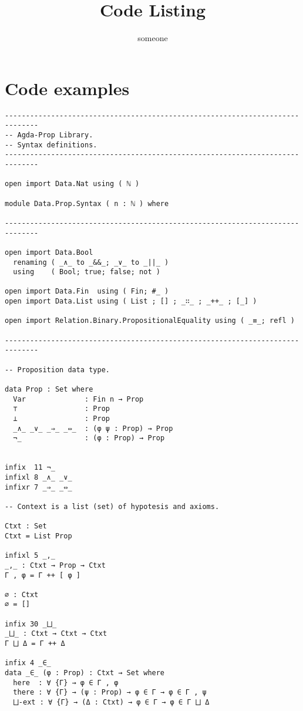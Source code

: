 \documentclass{article}
\title{Code Listing}
\author{someone}
\date{ }
\begin{document}
\maketitle

\section{Code examples}

\begin{listing}[ht]
\begin{verbatim}
------------------------------------------------------------------------------
-- Agda-Prop Library.
-- Syntax definitions.
------------------------------------------------------------------------------

open import Data.Nat using ( ℕ )

module Data.Prop.Syntax ( n : ℕ ) where

------------------------------------------------------------------------------

open import Data.Bool
  renaming ( _∧_ to _&&_; _∨_ to _||_ )
  using    ( Bool; true; false; not )

open import Data.Fin  using ( Fin; #_ )
open import Data.List using ( List ; [] ; _∷_ ; _++_ ; [_] )

open import Relation.Binary.PropositionalEquality using ( _≡_; refl )

------------------------------------------------------------------------------

-- Proposition data type.

data Prop : Set where
  Var              : Fin n → Prop
  ⊤                : Prop
  ⊥                : Prop
  _∧_ _∨_ _⇒_ _⇔_  : (φ ψ : Prop) → Prop
  ¬_               : (φ : Prop) → Prop


infix  11 ¬_
infixl 8 _∧_ _∨_
infixr 7 _⇒_ _⇔_

-- Context is a list (set) of hypotesis and axioms.

Ctxt : Set
Ctxt = List Prop

infixl 5 _,_
_,_ : Ctxt → Prop → Ctxt
Γ , φ = Γ ++ [ φ ]

∅ : Ctxt
∅ = []

infix 30 _⨆_
_⨆_ : Ctxt → Ctxt → Ctxt
Γ ⨆ Δ = Γ ++ Δ

infix 4 _∈_
data _∈_ (φ : Prop) : Ctxt → Set where
  here  : ∀ {Γ} → φ ∈ Γ , φ
  there : ∀ {Γ} → (ψ : Prop) → φ ∈ Γ → φ ∈ Γ , ψ
  ⨆-ext : ∀ {Γ} → (Δ : Ctxt) → φ ∈ Γ → φ ∈ Γ ⨆ Δ


\end{verbatim}
\end{listing}
\end{document}
